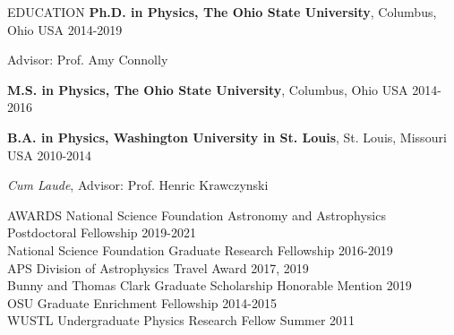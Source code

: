 \documentclass{resume} %
\newenvironment{list1}{
  \begin{list}{\ding{113}}{%
      \setlength{\itemsep}{0in}
      \setlength{\parsep}{0in} \setlength{\parskip}{0in}
      \setlength{\topsep}{0in} \setlength{\partopsep}{0in} 
      \setlength{\leftmargin}{0.17in}}}{\end{list}}
\begin{document}

\begin{rSection}{EDUCATION}
\textbf{Ph.D. in Physics, The Ohio State University}, Columbus, Ohio USA \hfill 2014-2019\\
\vspace*{-.15in}
\begin{list1}
\item[]Advisor: Prof. Amy Connolly
\end{list1}

\textbf{M.S. in Physics, The Ohio State University}, Columbus, Ohio USA \hfill 2014-2016

\textbf{B.A. in Physics, Washington University in St. Louis}, St. Louis, Missouri USA \hfill 2010-2014\\
\vspace*{-.15in}
\begin{list1}
\item[] \textit{Cum Laude}, Advisor: Prof. Henric Krawczynski
\end{list1}
\end{rSection}


\begin{rSection}{AWARDS}
National Science Foundation Astronomy and Astrophysics Postdoctoral Fellowship \hfill 2019-2021 \\
National Science Foundation Graduate Research Fellowship \hfill 2016-2019 \\
APS Division of Astrophysics Travel Award \hfill 2017, 2019 \\
Bunny and Thomas Clark Graduate Scholarship Honorable Mention \hfill 2019 \\
OSU Graduate Enrichment Fellowship \hfill 2014-2015 \\
WUSTL Undergraduate Physics Research Fellow \hfill Summer 2011 
\end{rSection}

\end{document}
